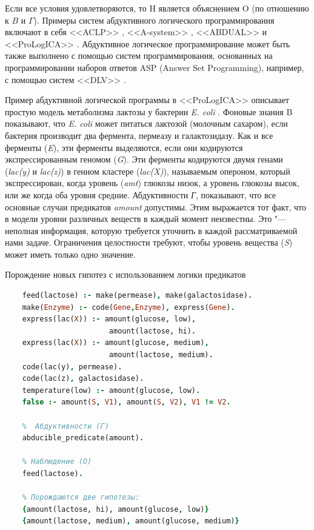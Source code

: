 Если все условия удовлетворяются, то H является объяснением O (по отношению к $B$ и $\Gamma$).  Примеры систем 
абдуктивного логического программирования включают в себя <<ACLP>> \cite{Kakas2000}, <<A-system>> \cite{Nuffelen2001}, 
<<ABDUAL>> \cite{Alferes2004} и <<ProLogICA>> \cite{Ray2006}. Абдуктивное логическое программирование может быть также 
выполнено с помощью систем программирования, основанных на программировании 
наборов ответов ASP (Answer Set Programming), например, с помощью систем <<DLV>> \cite{Leone2006}. 


Пример абдуктивной логической программы в <<ProLogICA>> описывает простую модель метаболизма лактозы у бактерии 
\textit{E. coli} \cite{Ray2006}. Фоновые знания B показывают, что \textit{E. coli} может питаться лактозой (молочным 
сахаром), если бактерия производит два фермента, пермеазу и галактозидазу. Как и все ферменты (\textit{E}), эти 
ферменты выделяются, если они кодируются экспрессированным геномом (\textit{G}). Эти ферменты кодируются двумя генами 
(\textit{lac(y)} и \textit{lac(z)}) в генном кластере (\textit{lac(X)}), называемым опероном, который экспрессирован, 
когда уровень (\textit{amt}) глюкозы низок, а уровень глюкозы высок, или же когда оба уровня средние. Абдуктивности 
\textit{Г}, показывают, что все основные случаи предикатов \textit{amount} допустимы. Этим выражается тот факт, что 
в модели уровни различных веществ в каждый момент неизвестны. Это "--- неполная информация, которую требуется  
уточнить в каждой рассматриваемой нами задаче. Ограничения целостности требуют, чтобы уровень вещества (\textit{S}) 
может иметь только одно значение.

\begin{ListingEnv}[!h]%
    \captiondelim{ } %
    \caption{Порождение новых гипотез с использованием логики предикатов}\label{list:generation}
    \begin{lstlisting}[language={Prolog}]
    %  Фоновые знания (B) 
    feed(lactose) :- make(permease), make(galactosidase).
    make(Enzyme) :- code(Gene,Enzyme), express(Gene).
    express(lac(X)) :- amount(glucose, low), 
                        amount(lactose, hi).
    express(lac(X)) :- amount(glucose, medium),
                        amount(lactose, medium).
    code(lac(y), permease).
    code(lac(z), galactosidase).
    temperature(low) :- amount(glucose, low).
    false :- amount(S, V1), amount(S, V2), V1 != V2.
    
    %  Абдуктивности (Г)
    abducible_predicate(amount).
    
    % Наблюдение (O)
    feed(lactose).

    % Порождаются две гипотезы:
    {amount(lactose, hi), amount(glucose, low)}
    {amount(lactose, medium), amount(glucose, medium)}
    \end{lstlisting}
\end{ListingEnv}%

